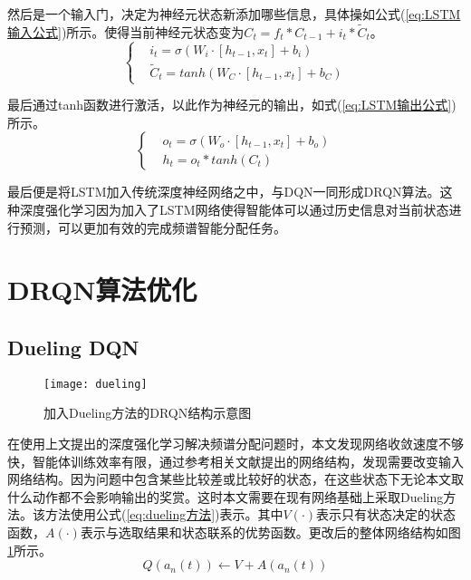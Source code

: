 然后是一个输入门，决定为神经元状态新添加哪些信息，具体操如公式(\ref{eq:LSTM输入公式})所示。使得当前神经元状态变为$C_{t}=f_{t}*C_{t-1}+i_{t}*\tilde{C}_{t}$。
\begin{equation}\label{eq:LSTM输入公式}
\left\lbrace 
\begin{aligned}
&i_{t}=\sigma \left ( W_{i} \cdot \left [ h_{t-1},x_{t} \right ] +b_{i}\right )\\
&\tilde{C}_{t}=tanh\left ( W_{C} \cdot \left [ h_{t-1},x_{t} \right ] +b_{C}\right )
\end{aligned}
\right.
\end{equation}

最后通过tanh函数进行激活，以此作为神经元的输出，如式(\ref{eq:LSTM输出公式})所示。
\begin{equation}\label{eq:LSTM输出公式}
\left\lbrace 
\begin{aligned}
&o_{t}=\sigma \left ( W_{o} \cdot \left [ h_{t-1},x_{t} \right ] +b_{o}\right )\\
&h_{t}=o_{t}*tanh\left ( C_{t} \right )
\end{aligned}
\right.
\end{equation}

最后便是将LSTM加入传统深度神经网络之中，与DQN一同形成DRQN算法。这种深度强化学习因为加入了LSTM网络使得智能体可以通过历史信息对当前状态进行预测，可以更加有效的完成频谱智能分配任务。

\section{DRQN算法优化}
\subsection{Dueling DQN}
\begin{figure}[h]
	\centering
	\texttt{[image: dueling]}
	\caption{加入Dueling方法的DRQN结构示意图}
	\label{fig:dueling结构图}
\end{figure}

在使用上文提出的深度强化学习解决频谱分配问题时，本文发现网络收敛速度不够快，智能体训练效率有限，通过参考相关文献提出的网络结构\cite{8254101}，发现需要改变输入网络结构。因为问题中包含某些比较差或比较好的状态，在这些状态下无论本文取什么动作都不会影响输出的奖赏。这时本文需要在现有网络基础上采取Dueling方法\cite{Wang2015Dueling}。该方法使用公式(\ref{eq:dueling方法})表示。其中$V\left(\cdot\right)$表示只有状态决定的状态函数，$A\left(\cdot\right)$表示与选取结果和状态联系的优势函数。更改后的整体网络结构如图\ref{fig:dueling结构图}所示。
\begin{equation}\label{eq:dueling方法}
Q\left ( a_{n}\left (t\right )\right )\leftarrow V + A\left ( a_{n}\left (t\right )\right )  
\end{equation}

